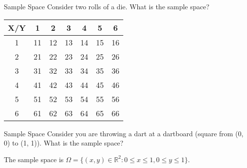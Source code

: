 \documentclass[handout]{beamer}
\begin{document}
\begin{frame}{Sample Space}
    Consider two rolls of a die. What is the sample space?

    \begin{table}[h]
    \centering
    \begin{tabular}{c|cccccc}
    \hline
    X/Y & 1 & 2 & 3 & 4 & 5 & 6 \\
    \hline
    1 & 11 & 12 & 13 & 14 & 15 & 16 \\
    2 & 21 & 22 & 23 & 24 & 25 & 26 \\
    3 & 31 & 32 & 33 & 34 & 35 & 36 \\
    4 & 41 & 42 & 43 & 44 & 45 & 46 \\
    5 & 51 & 52 & 53 & 54 & 55 & 56 \\
    6 & 61 & 62 & 63 & 64 & 65 & 66 \\
    \hline
    \end{tabular}
    \end{table}
    
\end{frame}

\begin{frame}{Sample Space}
    Consider you are throwing a dart at a dartboard (square from (0, 0) to (1, 1)). What is the sample space?

    \begin{figure}[h]
    \centering
    \end{figure}

    The sample space is $\Omega = \{(x, y) \in \mathbb{R}^2: 0 \leq x \leq 1, 0 \leq y \leq 1\}$.


    
\end{frame}
\end{document}
